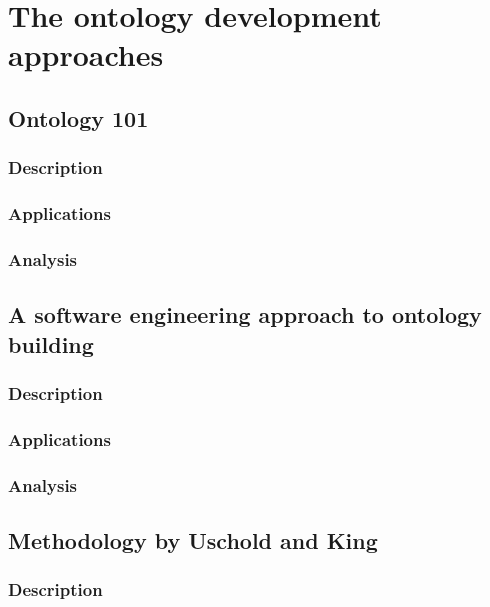 \section{The ontology development approaches}
\label{sec:ontology_approaches}

\subsection{Ontology 101}
\label{subsec:approach1}

\subsubsection{Description}

\subsubsection{Applications}

\subsubsection{Analysis}

\subsection{A software engineering approach to ontology building}
\label{subsec:approach2}

\subsubsection{Description}

\subsubsection{Applications}

\subsubsection{Analysis}

\subsection{Methodology by Uschold and King}
\label{subsec:approach3}

\subsubsection{Description}

